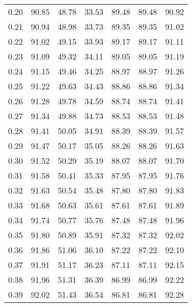 \begin{tabular}{|c|c|c|c|c|c|c|}
      0.20 &     90.85 &     48.78 &      33.53 &   89.48 &      89.48 &         90.92 \\
      0.21 &     90.94 &     48.98 &      33.73 &   89.35 &      89.35 &         91.02 \\
      0.22 &     91.02 &     49.15 &      33.93 &   89.17 &      89.17 &         91.11 \\
      0.23 &     91.09 &     49.32 &      34.11 &   89.05 &      89.05 &         91.19 \\
      0.24 &     91.15 &     49.46 &      34.25 &   88.97 &      88.97 &         91.26 \\
      0.25 &     91.22 &     49.63 &      34.43 &   88.86 &      88.86 &         91.34 \\
      0.26 &     91.28 &     49.78 &      34.59 &   88.74 &      88.74 &         91.41 \\
      0.27 &     91.34 &     49.88 &      34.73 &   88.53 &      88.53 &         91.48 \\
      0.28 &     91.41 &     50.05 &      34.91 &   88.39 &      88.39 &         91.57 \\
      0.29 &     91.47 &     50.17 &      35.05 &   88.26 &      88.26 &         91.63 \\
      0.30 &     91.52 &     50.29 &      35.19 &   88.07 &      88.07 &         91.70 \\
      0.31 &     91.58 &     50.41 &      35.33 &   87.95 &      87.95 &         91.76 \\
      0.32 &     91.63 &     50.54 &      35.48 &   87.80 &      87.80 &         91.83 \\
      0.33 &     91.68 &     50.63 &      35.61 &   87.61 &      87.61 &         91.89 \\
      0.34 &     91.74 &     50.77 &      35.76 &   87.48 &      87.48 &         91.96 \\
      0.35 &     91.80 &     50.89 &      35.91 &   87.32 &      87.32 &         92.02 \\
      0.36 &     91.86 &     51.06 &      36.10 &   87.22 &      87.22 &         92.10 \\
      0.37 &     91.91 &     51.17 &      36.23 &   87.11 &      87.11 &         92.15 \\
      0.38 &     91.96 &     51.31 &      36.39 &   86.99 &      86.99 &         92.22 \\
      0.39 &     92.02 &     51.43 &      36.54 &   86.81 &      86.81 &         92.28 \\

\end{tabular}

